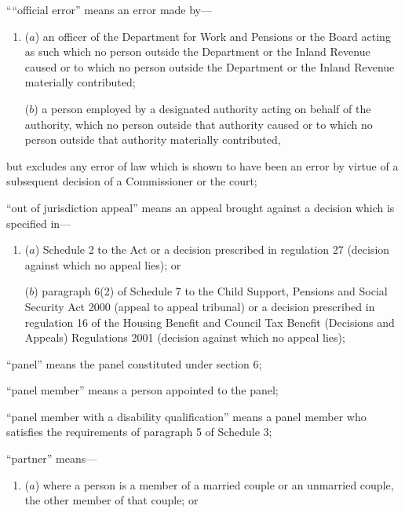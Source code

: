 \documentclass[12pt,a4paper]{article}
\begin{document}
\begin{enumerate}
    ““official error” means an error made by—
\begin{enumerate}\item[]
    ($a$) 
    an officer of the Department for Work and Pensions or the Board acting as such which no person outside the Department or the Inland Revenue caused or to which no person outside the Department or the Inland Revenue materially contributed;
 
   ($b$) 
    a person employed by a designated authority acting on behalf of the authority, which no person outside that authority caused or to which no person outside that authority materially contributed,
\end{enumerate}
    but excludes any error of law which is shown to have been an error by virtue of a subsequent decision of a Commissioner or the court;


“out of jurisdiction appeal” means an appeal brought against a decision which is specified in—
\begin{enumerate}\item[]
($a$) 
Schedule 2 to the Act or a decision prescribed in regulation 27 (decision against which no appeal lies); or

($b$) 
paragraph 6(2) of Schedule 7 to the Child Support, Pensions and Social Security Act 2000 (appeal to appeal tribunal) or a decision prescribed in regulation 16 of the Housing Benefit and Council Tax Benefit (Decisions and Appeals) Regulations 2001 (decision against which no appeal lies);
\end{enumerate}

\pagebreak[3]

“panel” means the panel constituted under section 6;

“panel member” means a person appointed to the panel;

“panel member with a disability qualification” means a panel member who satisfies the requirements of paragraph 5 of Schedule 3;

“partner” means—
\begin{enumerate}\item[]
    ($a$) 
    where a person is a member of a married couple or an unmarried couple, the other member of that couple; or


\end{enumerate}
\end{enumerate}
\end{document}
